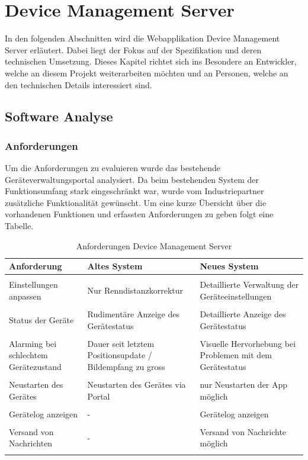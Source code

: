 \chapter{Device Management Server}

In den folgenden Abschnitten wird die Webapplikation Device Management Server erläutert. Dabei liegt der Fokus auf der Spezifikation und deren technischen Umsetzung. Dieses Kapitel richtet sich ins Besondere an Entwickler, welche an diesem Projekt weiterarbeiten möchten und an Personen, welche an den technischen Details interessiert sind.

\section{Software Analyse}

\subsection{Anforderungen}
Um die Anforderungen zu evaluieren wurde das bestehende Geräteverwaltungsportal analysiert. Da beim bestehenden System der Funktionsumfang stark eingeschränkt war, wurde vom Industriepartner zusätzliche Funktionalität gewünscht.
Um eine kurze Übersicht über die vorhandenen Funktionen und erfassten Anforderungen zu geben folgt  eine Tabelle.

\begin{longtable}{  p{3.5cm} | p{4.3cm} | p{4.3cm} }

    \textbf{Anforderung} & \textbf{Altes System} & \textbf{Neues System} \\ [1ex] \hline \hline & &  \\ [-1.5ex]
    Einstellungen anpassen & Nur Renndistanzkorrektur & Detaillierte Verwaltung der Geräteeinstellungen\\ [1ex] \hline & &  \\ [-1.5ex]
    Status der Geräte & Rudimentäre Anzeige des Gerätestatus & Detaillierte Anzeige des Gerätestatus\\ [1ex] \hline & &  \\ [-1.5ex]
     Alarming bei schlechtem Gerätezustand & Dauer seit letztem Positionsupdate / Bildempfang zu gross & Visuelle Hervorhebung bei Problemen mit dem Gerätestatus \\ [1ex] \hline & &  \\ [-1.5ex]
    Neustarten des Gerätes & Neustarten des Gerätes via Portal & nur Neustarten der App möglich\\ [1ex] \hline & &  \\ [-1.5ex]
    Gerätelog anzeigen & - & Gerätelog anzeigen\\ [1ex] \hline & &  \\ [-1.5ex]
    Versand von Nachrichten & - & Versand von Nachrichte möglich\\ [1ex] 
\caption{Anforderungen Device Management Server}
\end{longtable}

